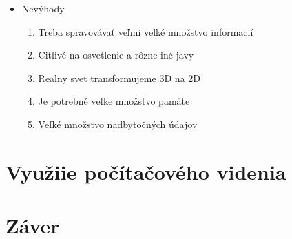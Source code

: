 \documentclass[10pt,twoside,slovak,a4paper]{coursepaper}
\begin{document}
\begin{itemize}
\item Nevýhody
	\begin{enumerate}
	\item Treba spravovávať veľmi velké množstvo informacií
	\item Citlivé na osvetlenie a rôzne iné javy
	\item Realny svet transformujeme 3D na 2D
	\item Je potrebné veľke množstvo pamäte
	\item Veľké množstvo nadbytočných údajov 
	\end{enumerate}
\end{itemize}









\section{Využiie počítačového videnia} \label{zaver} 


\section{Záver} \label{zaver} %






\end{document}
